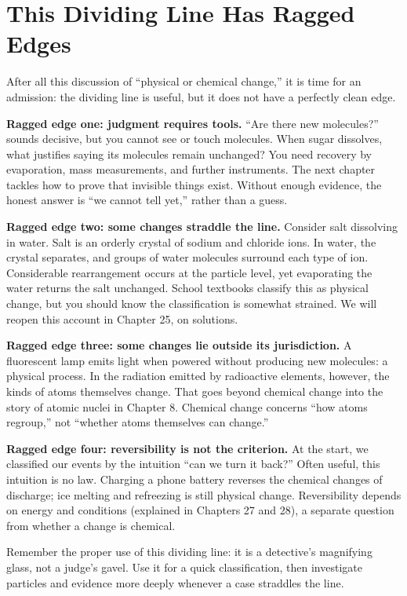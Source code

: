 \section{This Dividing Line Has Ragged Edges}

After all this discussion of ``physical or chemical change,'' it is time for an admission: the dividing line is useful, but it does not have a perfectly clean edge.

\textbf{Ragged edge one: judgment requires tools.} ``Are there new molecules?'' sounds decisive, but you cannot see or touch molecules. When sugar dissolves, what justifies saying its molecules remain unchanged? You need recovery by evaporation, mass measurements, and further instruments. The next chapter tackles how to prove that invisible things exist. Without enough evidence, the honest answer is ``we cannot tell yet,'' rather than a guess.

\textbf{Ragged edge two: some changes straddle the line.} Consider salt dissolving in water. Salt is an orderly crystal of sodium and chloride ions. In water, the crystal separates, and groups of water molecules surround each type of ion. Considerable rearrangement occurs at the particle level, yet evaporating the water returns the salt unchanged. School textbooks classify this as physical change, but you should know the classification is somewhat strained. We will reopen this account in Chapter 25, on solutions.

\textbf{Ragged edge three: some changes lie outside its jurisdiction.} A fluorescent lamp emits light when powered without producing new molecules: a physical process. In the radiation emitted by radioactive elements, however, the kinds of atoms themselves change. That goes beyond chemical change into the story of atomic nuclei in Chapter 8. Chemical change concerns ``how atoms regroup,'' not ``whether atoms themselves can change.''

\textbf{Ragged edge four: reversibility is not the criterion.} At the start, we classified our events by the intuition ``can we turn it back?'' Often useful, this intuition is no law. Charging a phone battery reverses the chemical changes of discharge; ice melting and refreezing is still physical change. Reversibility depends on energy and conditions (explained in Chapters 27 and 28), a separate question from whether a change is chemical.

Remember the proper use of this dividing line: it is a detective's magnifying glass, not a judge's gavel. Use it for a quick classification, then investigate particles and evidence more deeply whenever a case straddles the line.

